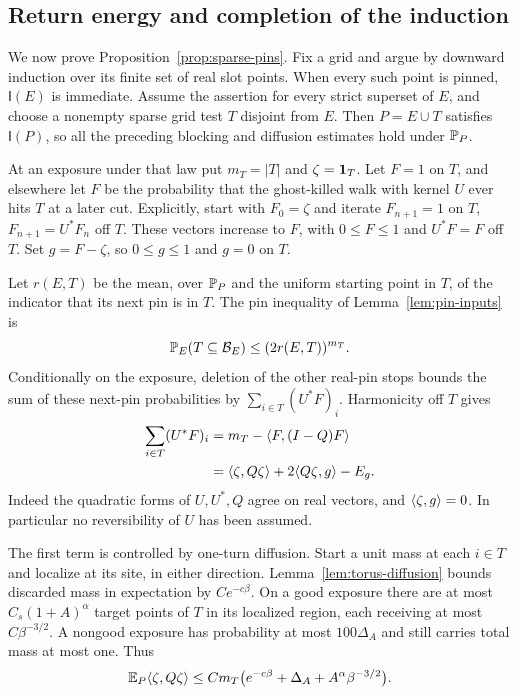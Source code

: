 \subsection{Return energy and completion of the induction}

We now prove Proposition~\ref{prop:sparse-pins}.  Fix a grid and
argue by downward induction over its finite set of real slot points.
When every such point is pinned, \(\mathsf I(E)\) is immediate.
Assume the assertion for every strict superset of \(E\), and choose
a nonempty sparse grid test \(T\) disjoint from \(E\).  Then
\(P=E\cup T\) satisfies \(\mathsf I(P)\), so all the preceding
blocking and diffusion estimates hold under \(\mathbb P_P\).

At an exposure under that law put \(m_T=|T|\) and
\(\zeta=\mathbf1_T\).  Let \(F=1\) on \(T\), and elsewhere let
\(F\) be the probability that the ghost-killed walk with kernel
\(U\) ever hits \(T\) at a later cut.  Explicitly, start with
\(F_0=\zeta\) and iterate
\(F_{n+1}=1\) on \(T\), \(F_{n+1}=U^*F_n\) off \(T\).
These vectors increase to \(F\), with \(0\le F\le1\) and
\(U^*F=F\) off \(T\).  Set \(g=F-\zeta\), so
\(0\le g\le1\) and \(g=0\) on \(T\).

Let \(r(E,T)\) be the mean, over \(\mathbb P_P\) and the uniform
starting point in \(T\), of the indicator that its next pin is
in \(T\).  The pin inequality of Lemma~\ref{lem:pin-inputs} is
\begin{equation}\label{eq:sparse-pin-reduction}
 \mathbb P_E(T\subseteq\mathcal B_E)\le(2r(E,T))^{m_T}.
\end{equation}
Conditionally on the exposure, deletion of the other real-pin stops
bounds the sum of these next-pin probabilities by
\(\sum_{i\in T}(U^*F)_i\).  Harmonicity off \(T\) gives
\begin{align}
 \sum_{i\in T}(U^*F)_i
 &=m_T-\langle F,(I-Q)F\rangle\notag\\
 &=\langle\zeta,Q\zeta\rangle+2\langle Q\zeta,g\rangle-E_g.
 \label{eq:torus-hitting-energy}
\end{align}
Indeed the quadratic forms of \(U,U^*,Q\) agree on real vectors,
and \(\langle\zeta,g\rangle=0\).  In particular no reversibility of \(U\)
has been assumed.

The first term is controlled by one-turn diffusion.  Start a unit mass
at each \(i\in T\) and localize at its site, in either direction.
Lemma~\ref{lem:torus-diffusion} bounds discarded mass in expectation
by \(Ce^{-c\beta}\).  On a good exposure there are at most
\(C_s(1+A)^\alpha\) target points of \(T\) in its localized
region, each receiving at most \(C\beta^{-3/2}\).  A nongood
exposure has probability at most \(100\Delta_A\) and still carries
total mass at most one.  Thus
\begin{equation}\label{eq:torus-short-return}
 \mathbb E_P\langle\zeta,Q\zeta\rangle
 \le Cm_T\bigl(e^{-c\beta}+\Delta_A+A^\alpha\beta^{-3/2}\bigr).
\end{equation}

